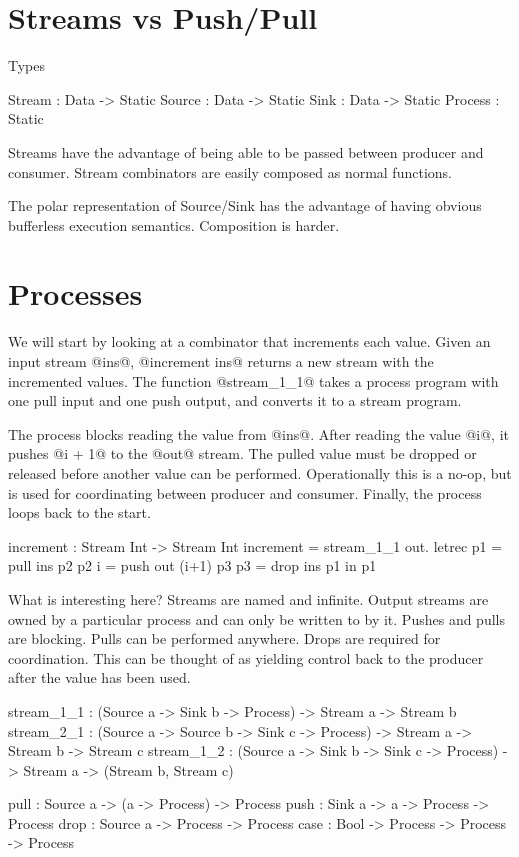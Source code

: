 \section{Streams vs Push/Pull}

Types
\begin{code}
Stream  : Data -> Static
Source  : Data -> Static
Sink    : Data -> Static
Process :         Static
\end{code}

Streams have the advantage of being able to be passed between producer and consumer.
Stream combinators are easily composed as normal functions.

The polar representation of Source/Sink has the advantage of having obvious bufferless execution semantics.
Composition is harder.



\section{Processes}
\label{s:ProcessZZZ}

We will start by looking at a combinator that increments each value.
Given an input stream @ins@, @increment ins@ returns a new stream with the incremented values.
The function @stream_1_1@ takes a process program with one pull input and one push output, and converts it to a stream program.

The process blocks reading the value from @ins@.
After reading the value @i@, it pushes @i + 1@ to the @out@ stream.
The pulled value must be dropped or released before another value can be performed.
Operationally this is a no-op, but is used for coordinating between producer and consumer.
Finally, the process loops back to the start.

\begin{code}
increment : Stream Int -> Stream Int
increment = stream_1_1 \ins out.
  letrec
    p1   = pull ins       p2
    p2 i = push out (i+1) p3
    p3   = drop ins       p1
  in p1
\end{code}

What is interesting here?
Streams are named and infinite.
Output streams are owned by a particular process and can only be written to by it.
Pushes and pulls are blocking.
Pulls can be performed anywhere.
Drops are required for coordination.
This can be thought of as yielding control back to the producer after the value has been used.

\begin{code}
stream_1_1 : (Source a -> Sink b
              -> Process)
          -> Stream a -> Stream b
stream_2_1 : (Source a -> Source b -> Sink c
              -> Process)
          -> Stream a -> Stream b -> Stream c
stream_1_2 : (Source a -> Sink b -> Sink c
              -> Process)
          -> Stream a -> (Stream b, Stream c)

pull : Source a -> (a -> Process) -> Process
push : Sink   a ->  a -> Process  -> Process
drop : Source a ->       Process  -> Process
case : Bool -> Process -> Process -> Process
\end{code}

